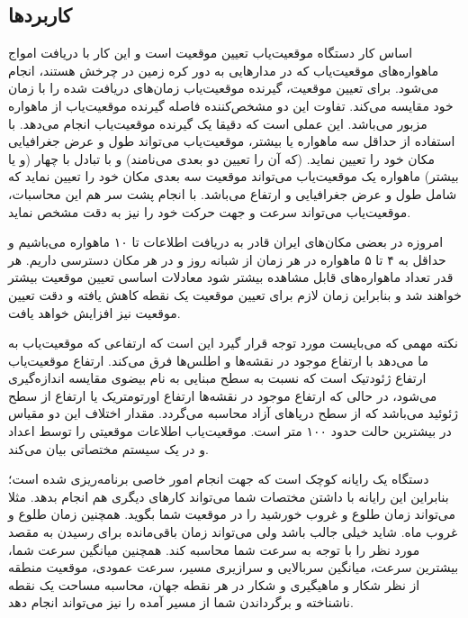 \subsection{کاربردها}
اساس کار دستگاه موقعیت‌یاب تعیین موقعیت است و این کار با دریافت امواج ماهواره‌های موقعیت‌یاب که در مدارهایی به دور کره زمین در چرخش هستند، انجام می‌شود. برای تعیین موقعیت، گیرنده موقعیت‌یاب زمان‌های دریافت شده را با زمان خود مقایسه می‌کند. تفاوت این دو مشخص‌کننده فاصله گیرنده موقعیت‌یاب از ماهواره مزبور می‌باشد. این عملی است که دقیقا یک گیرنده موقعیت‌یاب انجام می‌دهد. با استفاده از حداقل سه ماهواره یا بیشتر، موقعیت‌یاب می‌تواند طول و عرض جغرافیایی مکان خود را تعیین نماید. (که آن را تعیین دو بعدی می‌نامند) و با تبادل با چهار (و یا بیشتر) ماهواره یک موقعیت‌یاب می‌تواند موقعیت سه بعدی مکان خود را تعیین نماید که شامل طول و عرض جغرافیایی و ارتفاع می‌باشد. با انجام پشت سر هم این محاسبات، موقعیت‌یاب می‌تواند سرعت و جهت حرکت خود را نیز به دقت مشخص نماید.


امروزه در بعضی مکان‌های ایران قادر به دریافت اطلاعات تا ۱۰ ماهواره می‌باشیم و حداقل به ۴ تا ۵ ماهواره در هر زمان از شبانه روز و در هر مکان دسترسی داریم. هر قدر تعداد ماهواره‌های قابل مشاهده بیشتر شود معادلات اساسی تعیین موقعیت بیشتر خواهند شد و بنابراین زمان لازم برای تعیین موقعیت یک نقطه کاهش یافته و دقت تعیین موقعیت نیز افزایش خواهد یافت.


نکته مهمی که می‌بایست مورد توجه قرار گیرد این است که ارتفاعی که موقعیت‌یاب به ما می‌دهد با ارتفاع موجود در نقشه‌ها و اطلس‌ها فرق می‌کند. ارتفاع موقعیت‌یاب ارتفاع ژئودتیک است که نسبت به سطح مبنایی به نام بیضوی مقایسه اندازه‌گیری می‌شود، در حالی که ارتفاع موجود در نقشه‌ها ارتفاع اورتومتریک یا ارتفاع از سطح ژئوئید می‌باشد که از سطح دریاهای آزاد محاسبه می‌گردد. مقدار اختلاف این دو مقیاس در بیشترین حالت حدود ۱۰۰ متر است. موقعیت‌یاب اطلاعات موقعیتی را توسط اعداد و در یک سیستم مختصاتی بیان می‌کند. 


دستگاه  یک رایانه کوچک است که جهت انجام امور خاصی برنامه‌ریزی شده ‌است؛ بنابراین این رایانه با داشتن مختصات شما می‌تواند کارهای دیگری هم انجام بدهد. مثلا می‌تواند زمان طلوع و غروب خورشید را در موقعیت شما بگوید. همچنین زمان طلوع و غروب ماه. شاید خیلی جالب باشد ولی  می‌تواند زمان باقی‌مانده برای رسیدن به مقصد مورد نظر را با توجه به سرعت شما محاسبه کند. همچنین میانگین سرعت شما، بیشترین سرعت، میانگین سربالایی و سرازیری مسیر، سرعت عمودی، موقعیت منطقه از نظر شکار و ماهیگیری و شکار در هر نقطه جهان، محاسبه مساحت یک نقطه ناشناخته و برگرداندن شما از مسیر آمده را نیز می‌تواند انجام دهد.


